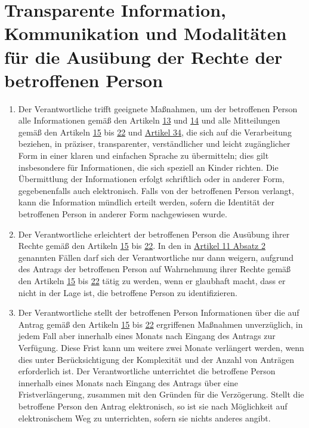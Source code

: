 \chapter{Transparente Information, Kommunikation und Modalitäten für die Ausübung der Rechte der betroffenen Person}
\label{ch:12}


\begin{enumerate}

  \item Der Verantwortliche trifft geeignete Maßnahmen, um der betroffenen Person alle Informationen gemäß den Artikeln
   \hyperref[ch:13]{13} und \hyperref[ch:14]{14} und alle Mitteilungen gemäß den Artikeln \hyperref[ch:15]{15} bis
   \hyperref[ch:22]{22} und \hyperref[ch:34]{Artikel 34}, die sich auf die Verarbeitung beziehen, in präziser,
    transparenter, verständlicher und leicht zugänglicher Form in einer klaren und einfachen Sprache zu übermitteln;
    dies gilt insbesondere für Informationen, die sich speziell an Kinder richten. Die Übermittlung der Informationen
    erfolgt schriftlich oder in anderer Form, gegebenenfalls auch elektronisch. Falls von der betroffenen Person
    verlangt, kann die Information mündlich erteilt werden, sofern die Identität der betroffenen Person in anderer Form
    nachgewiesen wurde.
  \label{itm:12-1}

  \item Der Verantwortliche erleichtert der betroffenen Person die Ausübung ihrer Rechte gemäß den Artikeln \hyperref
   [ch:15]{15} bis \hyperref[ch:22]{22}. In den in \hyperref[itm:11-2]{Artikel 11 Absatz 2} genannten Fällen darf sich
   der Verantwortliche nur dann weigern, aufgrund des Antrags der betroffenen Person auf Wahrnehmung ihrer Rechte gemäß
   den Artikeln \hyperref[ch:15]{15} bis \hyperref[ch:22]{22} tätig zu werden, wenn er glaubhaft macht, dass er nicht
   in der Lage ist, die betroffene Person zu identifizieren.
  \label{itm:12-2}

  \item Der Verantwortliche stellt der betroffenen Person Informationen über die auf Antrag gemäß den Artikeln \hyperref
   [ch:15]{15} bis \hyperref[ch:22]{22} ergriffenen Maßnahmen unverzüglich, in jedem Fall aber innerhalb eines Monats
   nach Eingang des Antrags zur Verfügung. Diese Frist kann um weitere zwei Monate verlängert werden, wenn dies unter
   Berücksichtigung der Komplexität und der Anzahl von Anträgen erforderlich ist. Der Verantwortliche unterrichtet die
   betroffene Person innerhalb eines Monats nach Eingang des Antrags über eine Fristverlängerung, zusammen mit den
   Gründen für die Verzögerung. Stellt die betroffene Person den Antrag elektronisch, so ist sie nach Möglichkeit auf
   elektronischem Weg zu unterrichten, sofern sie nichts anderes angibt.
  \label{itm:12-3}


\end{enumerate}
